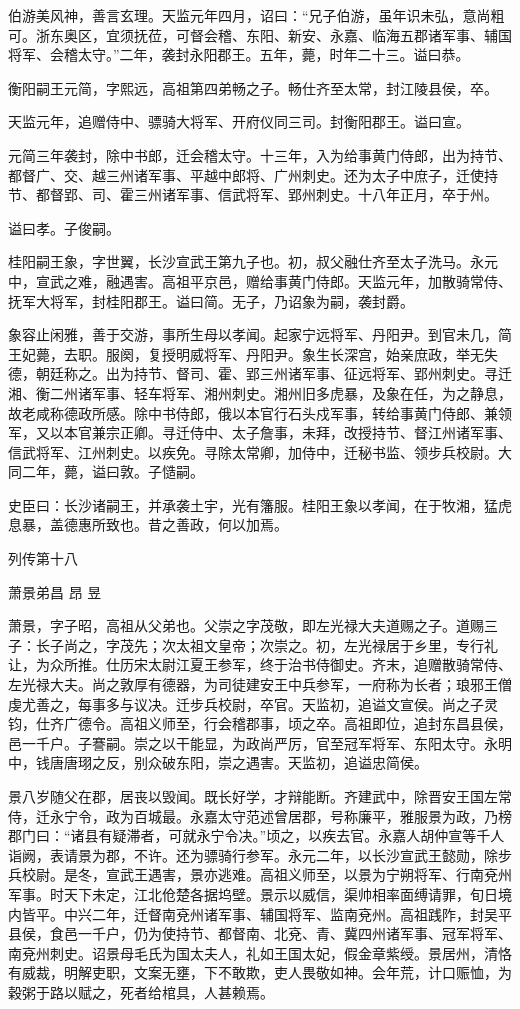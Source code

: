 \documentclass[12pt,UTF8]{ctexbook}
\begin{document}
伯游美风神，善言玄理。天监元年四月，诏曰：“兄子伯游，虽年识未弘，意尚粗可。浙东奥区，宜须抚莅，可督会稽、东阳、新安、永嘉、临海五郡诸军事、辅国将军、会稽太守。”二年，袭封永阳郡王。五年，薨，时年二十三。谥曰恭。

衡阳嗣王元简，字熙远，高祖第四弟畅之子。畅仕齐至太常，封江陵县侯，卒。

天监元年，追赠侍中、骠骑大将军、开府仪同三司。封衡阳郡王。谥曰宣。

元简三年袭封，除中书郎，迁会稽太守。十三年，入为给事黄门侍郎，出为持节、都督广、交、越三州诸军事、平越中郎将、广州刺史。还为太子中庶子，迁使持节、都督郢、司、霍三州诸军事、信武将军、郢州刺史。十八年正月，卒于州。

谥曰孝。子俊嗣。

桂阳嗣王象，字世翼，长沙宣武王第九子也。初，叔父融仕齐至太子洗马。永元中，宣武之难，融遇害。高祖平京邑，赠给事黄门侍郎。天监元年，加散骑常侍、抚军大将军，封桂阳郡王。谥曰简。无子，乃诏象为嗣，袭封爵。

象容止闲雅，善于交游，事所生母以孝闻。起家宁远将军、丹阳尹。到官未几，简王妃薨，去职。服阕，复授明威将军、丹阳尹。象生长深宫，始亲庶政，举无失德，朝廷称之。出为持节、督司、霍、郢三州诸军事、征远将军、郢州刺史。寻迁湘、衡二州诸军事、轻车将军、湘州刺史。湘州旧多虎暴，及象在任，为之静息，故老咸称德政所感。除中书侍郎，俄以本官行石头戍军事，转给事黄门侍郎、兼领军，又以本官兼宗正卿。寻迁侍中、太子詹事，未拜，改授持节、督江州诸军事、信武将军、江州刺史。以疾免。寻除太常卿，加侍中，迁秘书监、领步兵校尉。大同二年，薨，谥曰敦。子慥嗣。

史臣曰：长沙诸嗣王，并承袭土宇，光有籓服。桂阳王象以孝闻，在于牧湘，猛虎息暴，盖德惠所致也。昔之善政，何以加焉。





列传第十八

萧景弟昌 昂 昱

萧景，字子昭，高祖从父弟也。父崇之字茂敬，即左光禄大夫道赐之子。道赐三子：长子尚之，字茂先；次太祖文皇帝；次崇之。初，左光禄居于乡里，专行礼让，为众所推。仕历宋太尉江夏王参军，终于治书侍御史。齐末，追赠散骑常侍、左光禄大夫。尚之敦厚有德器，为司徒建安王中兵参军，一府称为长者；琅邪王僧虔尤善之，每事多与议决。迁步兵校尉，卒官。天监初，追谥文宣侯。尚之子灵钧，仕齐广德令。高祖义师至，行会稽郡事，顷之卒。高祖即位，追封东昌县侯，邑一千户。子謇嗣。崇之以干能显，为政尚严厉，官至冠军将军、东阳太守。永明中，钱唐唐珝之反，别众破东阳，崇之遇害。天监初，追谥忠简侯。

景八岁随父在郡，居丧以毁闻。既长好学，才辩能断。齐建武中，除晋安王国左常侍，迁永宁令，政为百城最。永嘉太守范述曾居郡，号称廉平，雅服景为政，乃榜郡门曰：“诸县有疑滞者，可就永宁令决。”顷之，以疾去官。永嘉人胡仲宣等千人诣阙，表请景为郡，不许。还为骠骑行参军。永元二年，以长沙宣武王懿勋，除步兵校尉。是冬，宣武王遇害，景亦逃难。高祖义师至，以景为宁朔将军、行南兗州军事。时天下未定，江北伧楚各据坞壁。景示以威信，渠帅相率面缚请罪，旬日境内皆平。中兴二年，迁督南兗州诸军事、辅国将军、监南兗州。高祖践阼，封吴平县侯，食邑一千户，仍为使持节、都督南、北兗、青、冀四州诸军事、冠军将军、南兗州刺史。诏景母毛氏为国太夫人，礼如王国太妃，假金章紫绶。景居州，清恪有威裁，明解吏职，文案无壅，下不敢欺，吏人畏敬如神。会年荒，计口赈恤，为穀粥于路以赋之，死者给棺具，人甚赖焉。
\end{document}
